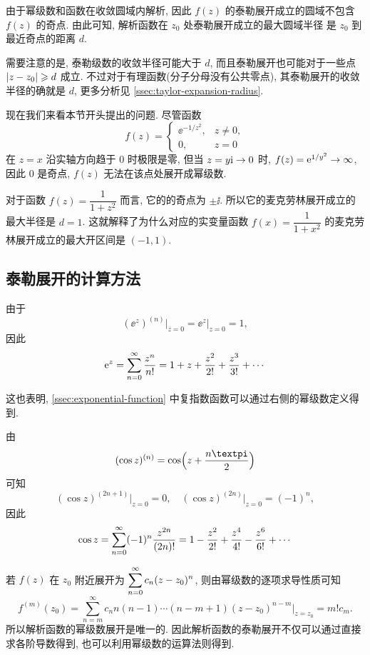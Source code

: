 由于幂级数和函数在收敛圆域内解析, 因此 $f(z)$ 的泰勒展开成立的圆域不包含 $f(z)$ 的奇点.
由此可知, 解析函数在 $z_0$ 处\alert{泰勒展开成立的最大圆域半径 是 $z_0$ 到最近奇点的距离} $d$.

需要注意的是, 泰勒级数的收敛半径可能大于 $d$, 而且泰勒展开也可能对于一些点 $\lvert z-z_0\rvert\geqslant d$ 成立.
不过对于有理函数(分子分母没有公共零点), 其泰勒展开的收敛半径的确就是 $d$, 更多分析见 \ref{ssec:taylor-expansion-radius}.

现在我们来看本节开头提出的问题. 尽管函数
\[
  f(z)=\begin{cases}
    \ee^{-1/z^2},&z\neq 0,\\
    0,&z=0
  \end{cases}
\]
在 $z=x$ 沿实轴方向趋于 $0$ 时极限是零, 但当 $z=y\mathrm{i}\rightarrow0$ 时, $f(z)=\mathrm{e}^{1/y^2}\rightarrow\infty$, 因此 $0$ 是奇点, $f(z)$ 无法在该点处展开成幂级数.

对于函数 $f(z)=\dfrac1{1+z^2}$ 而言, 它的的奇点为 $\pm\ii$.
所以它的麦克劳林展开成立的最大半径是 $d=1$.
这就解释了为什么对应的实变量函数 $f(x)=\dfrac1{1+x^2}$ 的麦克劳林展开成立的最大开区间是 $(-1,1)$.


\subsection{泰勒展开的计算方法}

\begin{example}
  \label{exam:exp-taylor-expansion}
  由于
  \[
    (\ee^z)^{(n)}\big|_{z=0}=\ee^z\big|_{z=0}=1,
  \]
  因此
  \[
     \mathrm{e}^z=\displaystyle\sum_{n=0}^{\infty} \frac{z^n}{n!}
    =1+z+\frac{z^2}{2!}+\frac{z^3}{3!}+\cdots
  \]
\end{example}

这也表明, \ref{ssec:exponential-function} 中复指数函数可以通过右侧的幂级数定义得到.

\begin{example}
  由
  \[
    (\cos z)^{(n)}=\cos\Bigl(z+\frac{n\cpi}2\Bigr)
  \]
  可知
  \[
    (\cos z)^{(2n+1)}\big|_{z=0}=0,\quad 
    (\cos z)^{(2n)}\big|_{z=0}=(-1)^n,
  \]
  因此
  \[
     \cos z
    =\displaystyle\sum_{n=0}^{\infty} (-1)^n\frac{z^{2n}}{(2n)!}
    =1-\frac{z^2}{2!}+\frac{z^4}{4!}-\frac{z^6}{6!}+\cdots
  \]
\end{example}

若 $f(z)$ 在 $z_0$ 附近展开为 $\displaystyle\sum_{n=0}^{\infty} c_n(z-z_0)^n$,
则由幂级数的逐项求导性质可知
\[
   f^{(m)}(z_0)
  =\sum_{n=m}^\infty c_n n(n-1)\cdots(n-m+1)(z-z_0)^{n-m}
    \Big|_{z=z_0}
  =m!c_m.
\]
所以\alert{解析函数的幂级数展开是唯一的}.
因此解析函数的泰勒展开不仅可以通过直接求各阶导数得到, 也可以\alert{利用幂级数的运算法则得到}.

